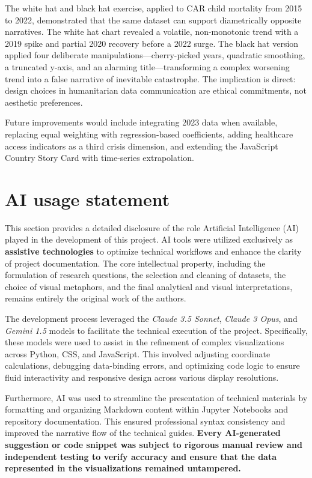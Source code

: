 \documentclass{article}
\begin{document}
The white hat and black hat exercise, applied to CAR child mortality from 2015 to 2022, demonstrated that the same dataset can support diametrically opposite narratives. The white hat chart revealed a volatile, non-monotonic trend with a 2019 spike and partial 2020 recovery before a 2022 surge. The black hat version applied four deliberate manipulations---cherry-picked years, quadratic smoothing, a truncated y-axis, and an alarming title---transforming a complex worsening trend into a false narrative of inevitable catastrophe. The implication is direct: design choices in humanitarian data communication are ethical commitments, not aesthetic preferences.

Future improvements would include integrating 2023 data when available, replacing equal weighting with regression-based coefficients, adding healthcare access indicators as a third crisis dimension, and extending the JavaScript Country Story Card with time-series extrapolation.

\newpage
\nocite{*}



\newpage
\appendix

\section{AI usage statement}

This section provides a detailed disclosure of the role Artificial Intelligence (AI) played in the development of this project. AI tools were utilized exclusively as \textbf{assistive technologies} to optimize technical workflows and enhance the clarity of project documentation. The core intellectual property, including the formulation of research questions, the selection and cleaning of datasets, the choice of visual metaphors, and the final analytical and visual interpretations, remains entirely the original work of the authors.

The development process leveraged the \textit{Claude 3.5 Sonnet}, \textit{Claude 3 Opus}, and \textit{Gemini 1.5} models to facilitate the technical execution of the project. Specifically, these models were used to assist in the refinement of complex visualizations across Python, CSS, and JavaScript. This involved adjusting coordinate calculations, debugging data-binding errors, and optimizing code logic to ensure fluid interactivity and responsive design across various display resolutions.

Furthermore, AI was used to streamline the presentation of technical materials by formatting and organizing Markdown content within Jupyter Notebooks and repository documentation. This ensured professional syntax consistency and improved the narrative flow of the technical guides. \textbf{Every AI-generated suggestion or code snippet was subject to rigorous manual review and independent testing to verify accuracy and ensure that the data represented in the visualizations remained untampered.}
\end{document}
